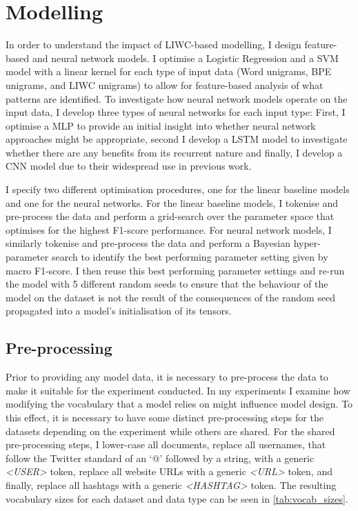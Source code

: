 \section{Modelling}\label{sec:liwc_modelling}
In order to understand the impact of LIWC-based modelling, I design feature-based and neural network models.
I optimise a Logistic Regression and a SVM model with a linear kernel for each type of input data (Word unigrams, BPE unigrams, and LIWC unigrams) to allow for feature-based analysis of what patterns are identified.
To investigate how neural network models operate on the input data, I develop three types of neural networks for each input type: First, I optimise a MLP to provide an initial insight into whether neural network approaches might be appropriate, second I develop a LSTM model to investigate whether there are any benefits from its recurrent nature and finally, I develop a CNN model due to their widespread use in previous work.

I specify two different optimisation procedures, one for the linear baseline models and one for the neural networks.
For the linear baseline models, I tokenise and pre-process the data and perform a grid-search over the parameter space that optimises for the highest F1-score performance.
For neural network models, I similarly tokenise and pre-process the data and perform a Bayesian hyper-parameter search to identify the best performing parameter setting given by macro F1-score.
I then reuse this best performing parameter settings and re-run the model with 5 different random seeds to ensure that the behaviour of the model on the dataset is not the result of the consequences of the random seed propagated into a model's initialisation of its tensors.

\subsection{Pre-processing}

Prior to providing any model data, it is necessary to pre-process the data to make it suitable for the experiment conducted.
In my experiments I examine how modifying the vocabulary that a model relies on might influence model design.
To this effect, it is necessary to have some distinct pre-processing steps for the datasets depending on the experiment while others are shared.
For the shared pre-processing steps, I lower-case all documents, replace all usernames, that follow the Twitter standard of an `@' followed by a string, with a generic \textit{<USER>} token, replace all website URLs with a generic \textit{<URL>} token, and finally, replace all hashtags with a generic \textit{<HASHTAG>} token. 
The resulting vocabulary sizes for each dataset and data type can be seen in \cref{tab:vocab_sizes}.

